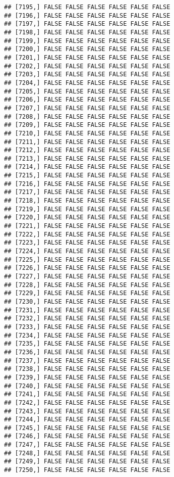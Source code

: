 \documentclass[
]{article}
\begin{document}
\begin{verbatim}
## [7195,] FALSE FALSE FALSE FALSE FALSE FALSE
## [7196,] FALSE FALSE FALSE FALSE FALSE FALSE
## [7197,] FALSE FALSE FALSE FALSE FALSE FALSE
## [7198,] FALSE FALSE FALSE FALSE FALSE FALSE
## [7199,] FALSE FALSE FALSE FALSE FALSE FALSE
## [7200,] FALSE FALSE FALSE FALSE FALSE FALSE
## [7201,] FALSE FALSE FALSE FALSE FALSE FALSE
## [7202,] FALSE FALSE FALSE FALSE FALSE FALSE
## [7203,] FALSE FALSE FALSE FALSE FALSE FALSE
## [7204,] FALSE FALSE FALSE FALSE FALSE FALSE
## [7205,] FALSE FALSE FALSE FALSE FALSE FALSE
## [7206,] FALSE FALSE FALSE FALSE FALSE FALSE
## [7207,] FALSE FALSE FALSE FALSE FALSE FALSE
## [7208,] FALSE FALSE FALSE FALSE FALSE FALSE
## [7209,] FALSE FALSE FALSE FALSE FALSE FALSE
## [7210,] FALSE FALSE FALSE FALSE FALSE FALSE
## [7211,] FALSE FALSE FALSE FALSE FALSE FALSE
## [7212,] FALSE FALSE FALSE FALSE FALSE FALSE
## [7213,] FALSE FALSE FALSE FALSE FALSE FALSE
## [7214,] FALSE FALSE FALSE FALSE FALSE FALSE
## [7215,] FALSE FALSE FALSE FALSE FALSE FALSE
## [7216,] FALSE FALSE FALSE FALSE FALSE FALSE
## [7217,] FALSE FALSE FALSE FALSE FALSE FALSE
## [7218,] FALSE FALSE FALSE FALSE FALSE FALSE
## [7219,] FALSE FALSE FALSE FALSE FALSE FALSE
## [7220,] FALSE FALSE FALSE FALSE FALSE FALSE
## [7221,] FALSE FALSE FALSE FALSE FALSE FALSE
## [7222,] FALSE FALSE FALSE FALSE FALSE FALSE
## [7223,] FALSE FALSE FALSE FALSE FALSE FALSE
## [7224,] FALSE FALSE FALSE FALSE FALSE FALSE
## [7225,] FALSE FALSE FALSE FALSE FALSE FALSE
## [7226,] FALSE FALSE FALSE FALSE FALSE FALSE
## [7227,] FALSE FALSE FALSE FALSE FALSE FALSE
## [7228,] FALSE FALSE FALSE FALSE FALSE FALSE
## [7229,] FALSE FALSE FALSE FALSE FALSE FALSE
## [7230,] FALSE FALSE FALSE FALSE FALSE FALSE
## [7231,] FALSE FALSE FALSE FALSE FALSE FALSE
## [7232,] FALSE FALSE FALSE FALSE FALSE FALSE
## [7233,] FALSE FALSE FALSE FALSE FALSE FALSE
## [7234,] FALSE FALSE FALSE FALSE FALSE FALSE
## [7235,] FALSE FALSE FALSE FALSE FALSE FALSE
## [7236,] FALSE FALSE FALSE FALSE FALSE FALSE
## [7237,] FALSE FALSE FALSE FALSE FALSE FALSE
## [7238,] FALSE FALSE FALSE FALSE FALSE FALSE
## [7239,] FALSE FALSE FALSE FALSE FALSE FALSE
## [7240,] FALSE FALSE FALSE FALSE FALSE FALSE
## [7241,] FALSE FALSE FALSE FALSE FALSE FALSE
## [7242,] FALSE FALSE FALSE FALSE FALSE FALSE
## [7243,] FALSE FALSE FALSE FALSE FALSE FALSE
## [7244,] FALSE FALSE FALSE FALSE FALSE FALSE
## [7245,] FALSE FALSE FALSE FALSE FALSE FALSE
## [7246,] FALSE FALSE FALSE FALSE FALSE FALSE
## [7247,] FALSE FALSE FALSE FALSE FALSE FALSE
## [7248,] FALSE FALSE FALSE FALSE FALSE FALSE
## [7249,] FALSE FALSE FALSE FALSE FALSE FALSE
## [7250,] FALSE FALSE FALSE FALSE FALSE FALSE

\end{verbatim}
\end{document}
